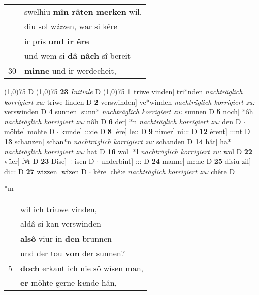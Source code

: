 \documentclass[8pt,a4paper,notitlepage]{article}
\begin{document}
\begin{table}[ht]
\begin{minipage}[t]{0.5\linewidth}
\begin{tabular}{rl}
 & swelhiu \textbf{mîn râten merken} wil,\\ 
 & diu sol w\textit{iz}zen, war si kêre\\ 
 & ir prîs \textbf{und ir êre}\\ 
 & und wem si \textbf{dâ nâch} sî bereit\\ 
30 & \textbf{minne} und ir werdecheit,\\ 
\end{tabular}
\scriptsize
\line(1,0){75} \newline
D \newline
\line(1,0){75} \newline
\textbf{23} \textit{Initiale} D  \newline
\line(1,0){75} \newline
\textbf{1} triwe vinden] tri*nden \textit{nachträglich korrigiert zu:} triwe finden D \textbf{2} verswinden] ve*winden \textit{nachträglich korrigiert zu:} verswinden D \textbf{4} sunnen] sunn* \textit{nachträglich korrigiert zu:} sunnen D \textbf{5} noch] *ôh \textit{nachträglich korrigiert zu:} nôh D \textbf{6} der] *n \textit{nachträglich korrigiert zu:} den D  $\cdot$ möhte] mohte D  $\cdot$ kunde] :::de D \textbf{8} lêre] le:: D \textbf{9} nimer] ni::: D \textbf{12} êrent] :::nt D \textbf{13} schanzen] schan*n \textit{nachträglich korrigiert zu:} schanden D \textbf{14} hât] ha* \textit{nachträglich korrigiert zu:} hat D \textbf{16} wol] *l \textit{nachträglich korrigiert zu:} wol D \textbf{22} vüer] fvͦr D \textbf{23} Dise] ÷isen D  $\cdot$ underbint] ::: D \textbf{24} manne] m::ne D \textbf{25} disiu zil] di::: D \textbf{27} wizzen] wîzen D  $\cdot$ kêre] chê:e \textit{nachträglich korrigiert zu:} chêre D \newline
\end{minipage}
\hspace{0.5cm}
\begin{minipage}[t]{0.5\linewidth}
\small
\begin{center}*m
\end{center}
\begin{tabular}{rl}
 & wil ich triuwe vinden,\\ 
 & aldâ si kan verswinden\\ 
 & \textbf{alsô} viur in \textbf{den} brunnen\\ 
 & und der tou \textbf{von} der sunnen?\\ 
5 & \textbf{doch} erkant ich nie sô wîsen man,\\ 
 & \textbf{er} möhte gerne k\textit{u}nde hân,\\ 

\end{tabular}
\end{minipage}
\end{table}
\end{document}
